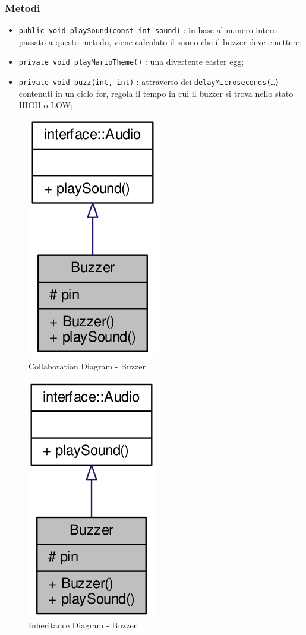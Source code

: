 \subsubsection{Metodi}
\begin{itemize}
	\item \texttt{public void playSound(const int sound)} : in base al numero intero passato a questo metodo, viene calcolato il suono che il buzzer deve emettere;
	\item \texttt{private void playMarioTheme()} : una divertente easter egg;
	\item \texttt{private void buzz(int, int)} : attraverso dei \texttt{delayMicroseconds(\dots)} contenuti in un ciclo for, regola il tempo in cui il buzzer si trova nello stato HIGH o LOW;
\end{itemize}
\begin{figure}[!ht]
	\centering
	\includegraphics[scale=.35]{img/UML/CollaborationDiagram/Buzzer.png}
	\caption{Collaboration Diagram - Buzzer}
\end{figure}
\begin{figure}[!ht]
	\centering
	\includegraphics[scale=.35]{img/UML/InheritanceDiagram/Buzzer.png}
	\caption{Inheritance Diagram - Buzzer}
\end{figure}

